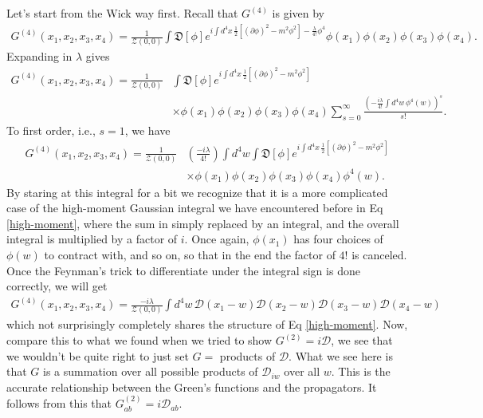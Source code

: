 \documentclass{book}
\theoremstyle{definition}
\newcommand{\p}{\partial}
\newcommand{\f}[2]{\frac{#1}{#2}}
\newcommand{\lp}{\left(}
\newcommand{\rp}{\right)}
\newcommand{\D}{\mathcal{D}}
\newcommand{\Z}{\mathcal{Z}}
\begin{document}
Let's start from the Wick way first. Recall that $G^{(4)}$ is given by
\begin{align}
G^{(4)}(x_1,x_2,x_3,x_4) = \f{1}{\Z(0,0)}\int \mathfrak{D}[\phi]e^{i\int d^4x\, \f{1}{2}[(\p \phi)^2 - m^2\phi^2]- \f{\lambda}{4!}\phi^4}\phi(x_1)\phi(x_2)\phi(x_3)\phi(x_4).
\end{align}
Expanding in $\lambda$ gives
\begin{align}
G^{(4)}(x_1,x_2,x_3,x_4) = \f{1}{\Z(0,0)}&\int \mathfrak{D}[\phi]e^{i\int d^4x\, \f{1}{2}[(\p \phi)^2 - m^2\phi^2]}\nonumber\\
&\times  \phi(x_1)\phi(x_2)\phi(x_3)\phi(x_4) \sum^\infty_{s=0}\f{\lp - \f{i\lambda}{4!}\int d^4w\,\phi^4(w)\rp^s}{s!}.
\end{align}
To first order, i.e., $s=1$, we have
\begin{align}
G^{(4)}(x_1,x_2,x_3,x_4) = \f{1}{\Z(0,0)}&\lp \f{-i\lambda}{4!} \rp\int d^4w\int \mathfrak{D}[\phi]e^{i\int d^4x\,\f{1}{2}[(\p \phi)^2 - m^2\phi^2]}\nonumber\\ &\times\phi(x_1)\phi(x_2)\phi(x_3)\phi(x_4)\phi^4(w).
\end{align}
By staring at this integral for a bit we recognize that it is a more complicated case of the high-moment Gaussian integral we have encountered before in Eq \eqref{high-moment}, where the sum in simply replaced by an integral, and the overall integral is multiplied by a factor of $i$. Once again, $\phi(x_1)$ has four choices of $\phi(w)$ to contract with, and so on, so that in the end the factor of $4!$ is canceled. Once the Feynman's trick to differentiate under the integral sign is done correctly, we will get
\begin{align}\label{four-sources}
\boxed{G^{(4)}(x_1,x_2,x_3,x_4) = \f{-i\lambda}{\Z(0,0)}\int d^4w\, \D(x_1 - w)\D(x_2 - w)\D(x_3 - w)\D(x_4 - w)}
\end{align}
which not surprisingly completely shares the structure of Eq \eqref{high-moment}. Now, compare this to what we found when we tried to show $G^{(2)} = i\D$, we see that we wouldn't be quite right to just set $G = $ products of $\D$. What we see here is that $G$ is a summation over all possible products of $\D_{iw}$ over all $w$. This is the accurate relationship between the Green's functions and the propagators. It follows from this that $G^{(2)}_{ab} = i\D_{ab}$.  \\
\end{document}

